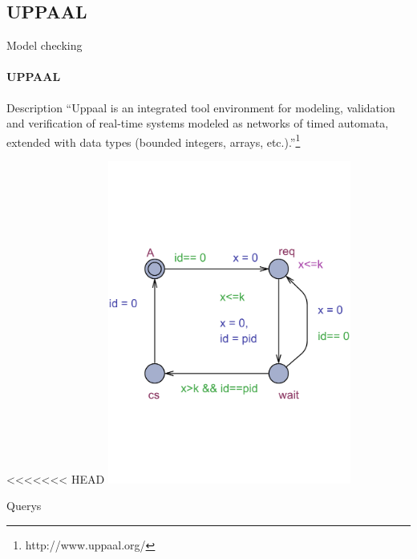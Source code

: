 \subsection{UPPAAL}
\begin{frame}[t]{Model checking}
	\framesubtitle{UPPAAL}
	
	\begin{block}{Description}
		\footnotesize 
		``Uppaal is an integrated tool environment for modeling, 
		validation and verification of real-time systems modeled as networks of timed automata, 
		extended with data types (bounded integers, arrays, etc.).''\footnote{http://www.uppaal.org/}
	\end{block}
	
<<<<<<< HEAD
	\includegraphics[trim=0 200 0 200,width=0.6\textwidth]{images/P.pdf}
	
	Querys
	

\end{frame}
